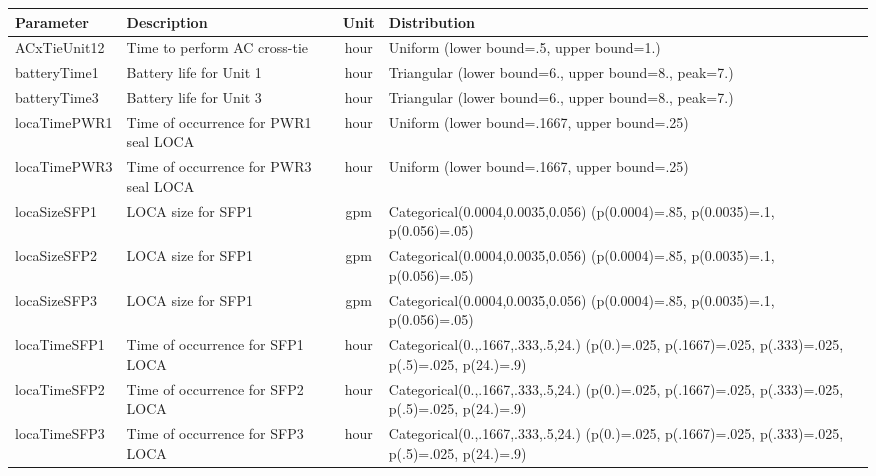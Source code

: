 \begin{table}
  \centering
  \begin{center}
      \begin{tabular}{ | l | p{5cm} | c | p{5cm} |}
        \hline
         \textbf{Parameter}          & \textbf{Description}                      & \textbf{Unit}   & \textbf{Distribution}                                         \\ \hline \hline
         ACxTieUnit12       & Time to perform AC cross-tie     & hour      & Uniform (lower bound=.5, upper bound=1.)             \\ \hline
         batteryTime1       & Battery life for Unit 1          & hour      & Triangular (lower bound=6., upper bound=8., peak=7.) \\ \hline
         batteryTime3       & Battery life for Unit 3          & hour      & Triangular (lower bound=6., upper bound=8., peak=7.) \\ \hline
         locaTimePWR1       & Time of occurrence for PWR1 seal LOCA & hour & Uniform (lower bound=.1667, upper bound=.25)         \\ \hline
         locaTimePWR3       & Time of occurrence for PWR3 seal LOCA & hour & Uniform (lower bound=.1667, upper bound=.25)         \\ \hline
         locaSizeSFP1       & LOCA size for SFP1               & gpm       & Categorical(0.0004,0.0035,0.056) (p(0.0004)=.85, p(0.0035)=.1, p(0.056)=.05)   \\ \hline
         locaSizeSFP2       & LOCA size for SFP1               & gpm       & Categorical(0.0004,0.0035,0.056) (p(0.0004)=.85, p(0.0035)=.1, p(0.056)=.05)   \\ \hline
         locaSizeSFP3       & LOCA size for SFP1               & gpm       & Categorical(0.0004,0.0035,0.056) (p(0.0004)=.85, p(0.0035)=.1, p(0.056)=.05)   \\ \hline    
         locaTimeSFP1       & Time of occurrence for SFP1 LOCA & hour      & Categorical(0.,.1667,.333,.5,24.) (p(0.)=.025, p(.1667)=.025, p(.333)=.025, p(.5)=.025, p(24.)=.9)  \\ \hline
         locaTimeSFP2       & Time of occurrence for SFP2 LOCA & hour      & Categorical(0.,.1667,.333,.5,24.) (p(0.)=.025, p(.1667)=.025, p(.333)=.025, p(.5)=.025, p(24.)=.9)  \\ \hline
         locaTimeSFP3       & Time of occurrence for SFP3 LOCA & hour      & Categorical(0.,.1667,.333,.5,24.) (p(0.)=.025, p(.1667)=.025, p(.333)=.025, p(.5)=.025, p(24.)=.9)  \\ \hline

\end{tabular}
\end{center}
\end{table}
